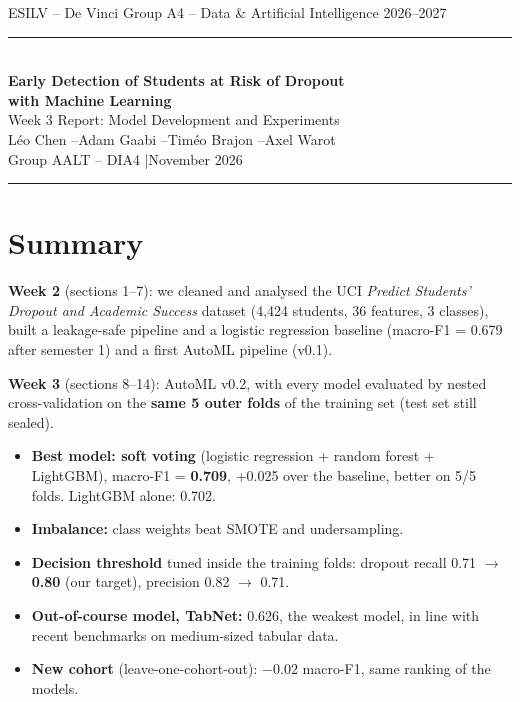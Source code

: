 \documentclass[11pt,a4paper]{article}
\begin{document}
\begin{center}
{\small ESILV -- De Vinci Group \hfill A4 -- Data \& Artificial Intelligence \hfill 2026--2027}\\[2pt]
\rule{\textwidth}{0.6pt}\\[12pt]
{\Large\bfseries Early Detection of Students at Risk of Dropout\\[4pt] with Machine Learning}\\[8pt]
{\large Week 3 Report: Model Development and Experiments}\\[10pt]
Léo Chen \quad--\quad Adam Gaabi \quad--\quad Timéo Brajon \quad--\quad Axel Warot\\[4pt]
{\small Group AALT -- DIA4 \quad|\quad November 2026}\\[6pt]
\rule{\textwidth}{0.6pt}
\end{center}

\section*{Summary}
\textbf{Week 2} (sections 1--7): we cleaned and analysed the UCI \textit{Predict Students' Dropout and Academic Success} dataset (4,424 students, 36 features, 3 classes), built a leakage-safe pipeline and a logistic regression baseline (macro-F1 = 0.679 after semester 1) and a first AutoML pipeline (v0.1).

\textbf{Week 3} (sections 8--14): AutoML v0.2, with every model evaluated by nested cross-validation on the \textbf{same 5 outer folds} of the training set (test set still sealed).
\begin{itemize}
\item \textbf{Best model: soft voting} (logistic regression + random forest + LightGBM), macro-F1 = \textbf{0.709}, +0.025 over the baseline, better on 5/5 folds. LightGBM alone: 0.702.
\item \textbf{Imbalance:} class weights beat SMOTE and undersampling.
\item \textbf{Decision threshold} tuned inside the training folds: dropout recall 0.71 $\rightarrow$ \textbf{0.80} (our target), precision 0.82 $\rightarrow$ 0.71.
\item \textbf{Out-of-course model, TabNet:} 0.626, the weakest model, in line with recent benchmarks on medium-sized tabular data.
\item \textbf{New cohort} (leave-one-cohort-out): $-0.02$ macro-F1, same ranking of the models.
\end{itemize}
\end{document}
